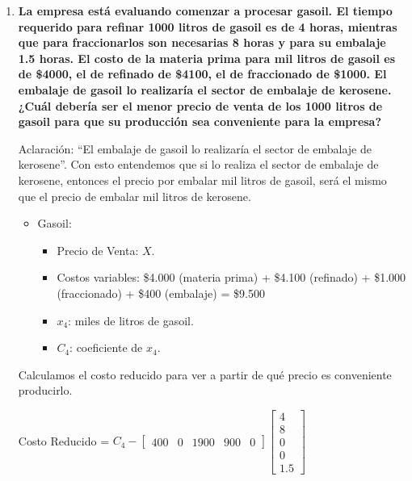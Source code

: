\documentclass[10pt,a4paper]{article}
\begin{document}
\begin{enumerate}[label=\textbf{\sffamily\large\arabic*.}]
    
    \item {\bfseries\large La empresa está evaluando comenzar a procesar gasoil. El tiempo requerido para refinar 1000 litros de gasoil
    es de 4 horas, mientras que para fraccionarlos son necesarias 8 horas y para su embalaje 1.5 horas. El costo
    de la materia prima para mil litros de gasoil es de \$4000, el de refinado de \$4100, el de fraccionado de \$1000.
    El embalaje de gasoil lo realizaría el sector de embalaje de kerosene. ¿Cuál debería ser el menor precio de
    venta de los 1000 litros de gasoil para que su producción sea conveniente para la empresa?}

    \vspace{1em}

    Aclaración: ``El embalaje de gasoil lo realizaría el sector de embalaje de kerosene''. Con esto entendemos que si lo realiza el sector de embalaje de kerosene, entonces el precio por embalar mil litros de gasoil, será el mismo que el precio de embalar mil litros de kerosene. 


    
    \begin{itemize}

        \item Gasoil:
        \begin{itemize}

            \item Precio de Venta: $X$.
            \item Costos variables: \$4.000 (materia prima) + \$4.100 (refinado) + \$1.000 (fraccionado) + \$400 (embalaje) = \$9.500 
            \item $x_{4}$: miles de litros de gasoil.
            \item $C_{4}$: coeficiente de $x_{4}$.\\
        \end{itemize}
\end{itemize}

Calculamos el costo reducido para ver a partir de qué precio es conveniente producirlo. 

   \vspace{1em}

Costo Reducido \: = $C_{4} - 
\begin{bmatrix}
400 & 0 & 1900 & 900 & 0
\end{bmatrix}
\begin{bmatrix}
4 \\ 8 \\ 0 \\ 0 \\ 1.5
\end{bmatrix}$ \\



\end{enumerate}
\end{document}
